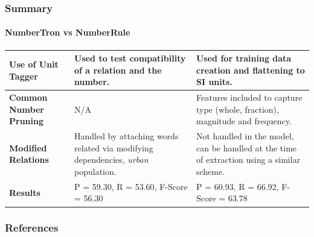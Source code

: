 \documentclass{beamer}
\begin{document}
\begin{frame}
\frametitle{Summary}
\framesubtitle{NumberTron vs NumberRule}
\begin{tabularx}{\textwidth}{|b |b |b |}
\hline
\textbf{Use of Unit Tagger} & Used to test compatibility of a relation and the number.& Used for training data creation and flattening to SI units.\\ \hline
 \textbf{Common Number Pruning} & N/A & Features included to capture type (whole, fraction), magnitude and frequency. \\ \hline
 \textbf{Modified Relations} & Handled by attaching words related via modifying dependencies, \emph{urban} population.& Not handled in the model, can be handled at the time of extraction using a similar scheme. \\ \hline
  \textbf{Results} & P = 59.30, R = 53.60, F-Score = 56.30& P = 60.93, R = 66.92, F-Score = 63.78\\ \hline
\end{tabularx}
\end{frame}

\begin{frame}[allowframebreaks]
        \frametitle{References}
        
        
\end{frame}
\end{document}
